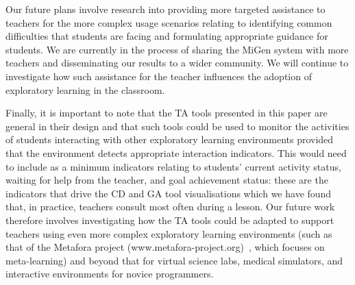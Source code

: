 Our future plans involve research into providing more targeted 
assistance to teachers for the more complex usage scenarios relating to
identifying common difficulties that students are facing and
formulating appropriate guidance for students. We are currently in the
process of sharing the MiGen system with more teachers and
disseminating our results to a wider community. We will continue 
to investigate how such assistance for the teacher
influences the adoption of exploratory learning in the classroom. 

Finally, it is important to note that the TA tools presented in this
paper are general in their design and that such tools could be used to
monitor the activities of students interacting with other exploratory
learning environments provided that the environment 
detects appropriate interaction indicators.
This would need to include as a minimum indicators relating to 
students' current activity status, 
waiting for help from the teacher, and goal
achievement status: 
these are the indicators that drive the CD and GA tool visualisations 
which we have found that, in practice, teachers consult most often during a lesson. 
Our future work therefore involves investigating how the TA tools
could be adapted to support teachers using even more complex
exploratory learning environments (such as that of the Metafora
project (www.metafora-project.org)~\cite{Dragon13}, which focuses on
meta-learning) and beyond that for virtual science labs, medical simulators, 
and interactive environments for novice programmers.

